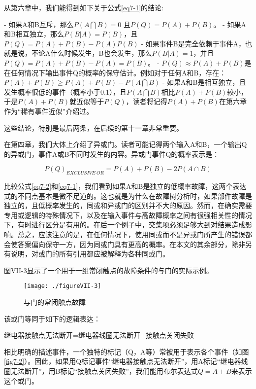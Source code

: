 \documentclass[cn,11pt,chinese]{elegantbook}
\begin{document}
{从第六章中，我们能得到如下关于公式\ref{eq7-1}的结论:

- 如果A和B互斥，那么$P(A\bigcap B)=0$ 且$P(Q)=P(A)+P(B)$。
- 如果A和B相互独立，那么$P(B|A)=P(B)$，且$P(Q)=P(A)+P(B)-P(A)P(B)$
- 如果事件B是完全依赖于事件A，也就是说，不论A什么时候发生，B也会发生，那么$P(B|A)=1$，并且$P(Q)=P(A)+P(B)-P(A)=P(B)$。
- $P(Q) \approx P(A)+P(B)$是在任何情况下输出事件Q的概率的保守估计。例如对于任何A和B，存在：$P(A)+P(B) \geq P(A)+P(B)-P(A \bigcap B)$
- 如果A和B是相互独立，且发生概率很低的事件（概率小于0.1），且$P(A\bigcap B)$相比$P(A)+P(B)$较小，于是$P(A)+P(B)$就近似等于$P(Q)$，读者将记得$P(A)+P(B)$在第六章作为“稀有事件近似”介绍过。

这些结论，特别是最后两条，在后续的第十一章非常重要。

在第四章，我们大体上介绍了异或门。读者可能记得两个输入A和B，一个输出Q的异或门，事件A或B不同时发生的内容。异或门事件Q的概率表示是：

\begin{equation}\label{eq7-2}
P(Q)_{EXCLUSIVE \ OR}=P(A)+P(B)-2P(A\cap B) 
\end{equation}

比较公式\ref{eq7-2}和\ref{eq7-1}，我们看到如果A和B是独立的低概率故障，这两个表达式的不同点基本是微不足道的。这也就是为什么在故障树分析时，如果部件故障是独立的，且低概率发生的，同或和异或门的区别并不大的原因。然而，在确实需要专用或逻辑的特殊情况下，以及在输入事件与高故障概率之间有很强相关性的情况下，有时进行区分是有用的。在后一个例子中，交集项必须足够大到对结果造成影响。总之，应该注意的是，在任何情况下，使用同或而不是异或门所产生的错误都会使答案偏向保守一方，因为同或门具有更高的概率。在本文的其余部分，除非另有说明，对或门的所有引用都应被解释为各种同或门。

图VII-3显示了一个用于一组常闭触点的故障条件的与门的实际示例。


\begin{figure}
	\texttt{[image: ./figureVII-3]}
	\caption{与门的常闭触点故障}
	\label{fig7-3}
\end{figure}

该或门等同于如下的逻辑表达：

继电器接触点无法断开=继电器线圈无法断开+接触点关闭失败

相比明确的描述事件，一个独特的标记（Q，A等）常被用于表示各个事件（如图\ref{fig7-2}）。因此，如果用Q标记事件“继电器接触点无法断开”，用A标记“继电器线圈无法断开”，用B标记“接触点关闭失败”，我们能用布尔表达式$Q=A+B$来表示这个或门。

}
\end{document}
